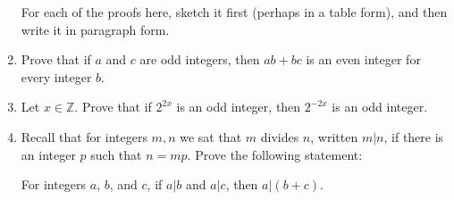 \documentclass[12pt]{article}
\newcommand{\ZZ}{{\mathbb Z}}  %
\begin{document}
\begin{enumerate}
   For each of the proofs here, sketch it first (perhaps in a table form), and then write it in paragraph form.

\item  Prove that if $a$ and $c$ are odd integers, then $ab+bc$ is an even integer for every integer $b$.

  
\item Let $x\in \ZZ$.  Prove that if $2^{2x}$ is an odd integer, then $2^{-2x}$ is an odd integer.

\item Recall that for integers $m,n$ we sat that $m$ divides $n$, written $m|n$, if there is an integer $p$ such that $n=mp$.
   Prove the following statement:

     For integers $a$, $b$, and $c$, if $a|b$ and $a|c$, then $a|(b+c)$.


\end{enumerate}
\end{document}
